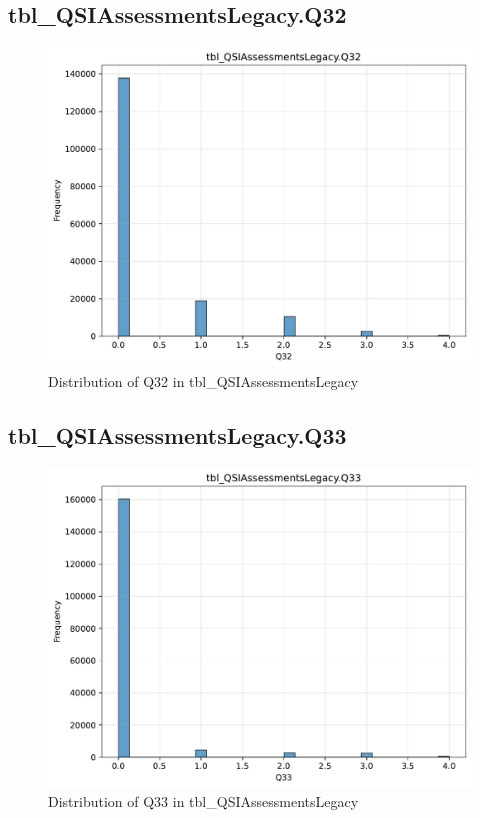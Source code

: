 \subsection{tbl\_QSIAssessmentsLegacy.Q32}

\begin{figure}[htbp]
\centering
\includegraphics[width=\textwidth]{figures/dbo_tbl_QSIAssessmentsLegacy_Q32.pdf}
\caption{Distribution of Q32 in tbl\_QSIAssessmentsLegacy}
\end{figure}\newpage

\subsection{tbl\_QSIAssessmentsLegacy.Q33}

\begin{figure}[htbp]
\centering
\includegraphics[width=\textwidth]{figures/dbo_tbl_QSIAssessmentsLegacy_Q33.pdf}
\caption{Distribution of Q33 in tbl\_QSIAssessmentsLegacy}
\end{figure}\newpage

